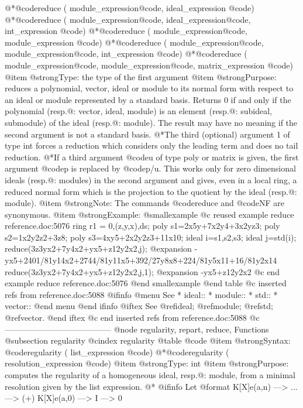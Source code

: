 {{{{{{@*@code{reduce (} module_expression@code{,} ideal_expression @code{)}
@*@code{reduce (} module_expression@code{,} ideal_expression@code{,} int_expression @code{)}
@*@code{reduce (} module_expression@code{,} module_expression @code{)}
@*@code{reduce (} module_expression@code{,} module_expression@code{,} int_expression @code{)}
@*@code{reduce (} module_expression@code{,} module_expression@code{,} matrix_expression @code{)}
@item @strong{Type:}
the type of the first argument
@item @strong{Purpose:}
reduces a polynomial, vector, ideal  or module to its normal form with respect to an ideal or module represented by a standard basis.
Returns 0 if and only if the polynomial (resp.@: vector, ideal, module)
is an element (resp.@: subideal, submodule) of the ideal (resp.@: module).
The result may have no meaning if the second argument is not a standard basis.
@*The third (optional) argument 1 of type int forces a reduction which considers only the leading term and does no tail reduction.
@*If a third argument @code{u} of type poly or matrix is given, the first argument @code{p} is replaced by @code{p/u}.
This works only for zero dimensional ideals (resp.@: modules) in the second argument and gives, even in a local ring, a reduced normal form which is the projection to the quotient by the ideal (resp.@: module).
@item @strong{Note:}
The commands @code{reduce} and @code{NF} are synonymous.
@item @strong{Example:}
@smallexample
@c reused example reduce reference.doc:5076 
  ring r1 = 0,(z,y,x),ds;
  poly s1=2x5y+7x2y4+3x2yz3;
  poly s2=1x2y2z2+3z8;
  poly s3=4xy5+2x2y2z3+11x10;
  ideal i=s1,s2,s3;
  ideal j=std(i);
  reduce(3z3yx2+7y4x2+yx5+z12y2x2,j);
@expansion{} -yx5+2401/81y14x2+2744/81y11x5+392/27y8x8+224/81y5x11+16/81y2x14
  reduce(3z3yx2+7y4x2+yx5+z12y2x2,j,1);
@expansion{} -yx5+z12y2x2
@c end example reduce reference.doc:5076
@end smallexample
@end table
@c inserted refs from reference.doc:5088
@ifinfo
@menu
See
* ideal::
* module::
* std::
* vector::
@end menu
@end ifinfo
@iftex
See
@ref{ideal};
@ref{module};
@ref{std};
@ref{vector}.
@end iftex
@c end inserted refs from reference.doc:5088
@c ---------------------------------------
@node regularity, repart, reduce, Functions
@subsection regularity
@cindex regularity
@table @code
@item @strong{Syntax:}
@code{regularity (} list_expression @code{)}
@*@code{regularity (} resolution_expression @code{)}
@item @strong{Type:}
int
@item @strong{Purpose:}
computes the regularity of a homogeneous ideal, resp.@: module, from a
minimal resolution given by the list expression.
@*
@ifinfo
Let
@format
       K[X]e(a,n) ---> ... ---> (+) K[X]e(a,0) ---> I ---> 0
}}}}}}
